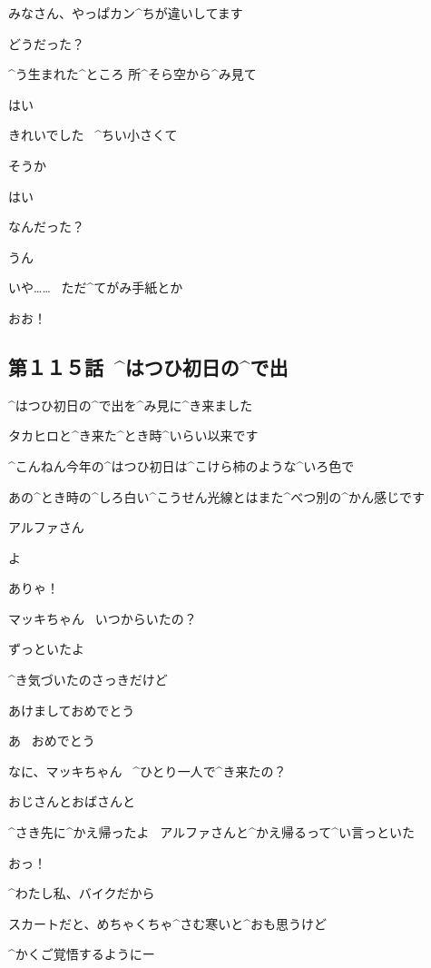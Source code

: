 \Alpha みなさん、やっぱカン^{ちが}{違}いしてます

\page
\Nai どうだった？

\Nai ^{う}{生}まれた^{ところ }{所}^{そら}{空}から^{み}{見}て

\Takahiro はい

\Takahiro きれいでした
\ ^{ちい}{小}さくて

\Nai そうか

\Takahiro はい

\page
\Alpha なんだった？

\Makki うん

\page
\Makki いや……
\ ただ^{てがみ}{手紙}とか

\Alpha おお！


\subsection{第１１５話\ ^{はつひ}{初日}の^{で}{出}}

\page[64]
\Alpha ^{はつひ}{初日}の^{で}{出}を^{み}{見}に^{き}{来}ました

\page[66]
\Alpha タカヒロと^{き}{来}た^{とき}{時}^{いらい}{以来}です

\Alpha ^{こんねん}{今年}の^{はつひ}{初日}は^{こけら}{柿}のような^{いろ}{色}で

\Alpha あの^{とき}{時}の^{しろ}{白}い^{こうせん}{光線}とはまた^{べつ}{別}の^{かん}{感}じです

\page
\Makki アルファさん

\page
\Makki よ

\Alpha ありゃ！

\Alpha マッキちゃん
\ いつからいたの？

\Makki ずっといたよ

\Makki ^{き}{気}づいたのさっきだけど

\page
\Makki あけましておめでとう

\Alpha あ
\ おめでとう

\Alpha なに、マッキちゃん
\ ^{ひとり}{一人}で^{き}{来}たの？

\Makki おじさんとおばさんと

\Makki ^{さき}{先}に^{かえ}{帰}ったよ
\ アルファさんと^{かえ}{帰}るって^{い}{言}っといた

\Alpha おっ！

\page
\Alpha ^{わたし}{私}、バイクだから

\Alpha スカートだと、めちゃくちゃ^{さむ}{寒}いと^{おも}{思}うけど

\Alpha ^{かくご}{覚悟}するようにー


